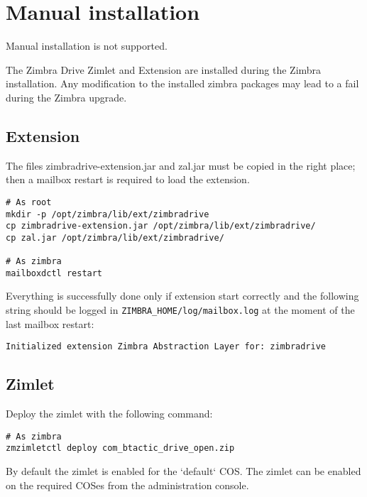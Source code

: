 \section{Manual installation}

\begin{comment}
WARNING:
\end{comment}
\begin{warning}
    Manual installation is not supported.

    The Zimbra Drive Zimlet and Extension are installed during the Zimbra installation.
    Any modification to the installed zimbra packages may lead to a fail during the Zimbra upgrade.
\end{warning}

\subsection{Extension}
    The files zimbradrive-extension.jar and zal.jar must be copied in the right place;
    then a mailbox restart is required to load the extension.
    \begin{verbatim}
# As root
mkdir -p /opt/zimbra/lib/ext/zimbradrive
cp zimbradrive-extension.jar /opt/zimbra/lib/ext/zimbradrive/
cp zal.jar /opt/zimbra/lib/ext/zimbradrive/

# As zimbra
mailboxdctl restart
    \end{verbatim}
    Everything is successfully done only if extension start correctly and the following string
    should be logged in \texttt{ZIMBRA\_HOME/log/mailbox.log} at the moment of the last mailbox restart:
    \begin{verbatim}
Initialized extension Zimbra Abstraction Layer for: zimbradrive
    \end{verbatim}

\subsection{Zimlet}
    Deploy the zimlet with the following command:
    \begin{verbatim}
# As zimbra
zmzimletctl deploy com_btactic_drive_open.zip
    \end{verbatim}
    By default the zimlet is enabled for the `default` COS.
    The zimlet can be enabled on the required COSes from the administration console.
